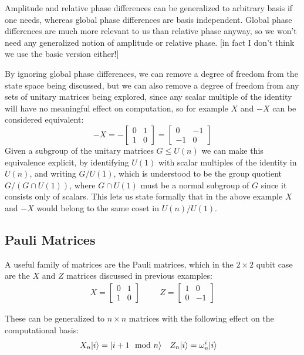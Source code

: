 Amplitude and relative phase differences can be generalized to arbitrary basis if one needs, whereas global phase differences are basis independent. Global phase differences are much more relevant to us than relative phase anyway, so we won't need any generalized notion of amplitude or relative phase. [in fact I don't think we use the basic version either!]

By ignoring global phase differences, we can remove a degree of freedom from the state space being discussed, but we can also remove a degree of freedom from any sets of unitary matrices being explored, since any scalar multiple of the identity will have no meaningful effect on computation, so for example $X$ and $-X$ can be considered equivalent:
\[-X = -\left[\begin{matrix}0 & 1 \\ 1 & 0\end{matrix}\right]= \left[\begin{matrix}0 & -1 \\ -1 & 0\end{matrix}\right]\]
Given a subgroup of the unitary matrices $G \leq U(n)$ we can make this equivalence explicit, by identifying $U(1)$ with scalar multiples of the identity in $U(n)$, and writing $G/U(1)$, which is understood to be the group quotient $G/(G \cap U(1))$, where $G \cap U(1)$ must be a normal subgroup of $G$ since it consists only of scalars. This lets us state formally that in the above example $X$ and $-X$ would belong to the same coset in $U(n)/U(1)$.
\subsection{Pauli Matrices}
A useful family of matrices are the Pauli matrices, which in the $2\times2$ qubit case are the $X$ and $Z$ matrices discussed in previous examples:
\begin{align*}
X = \left[\begin{matrix}
0&1\\
1&0
\end{matrix}\right]
&&&
Z = \left[\begin{matrix}
1&0\\
0&-1
\end{matrix}\right]
\end{align*}

These can be generalized to $n\times n$ matrices with the following effect on the computational basis:
\begin{align*}
X_n| i \rangle = | i+1\mod n \rangle
&&&
Z_n| i \rangle = \omega_n^i| i \rangle
\end{align*}

